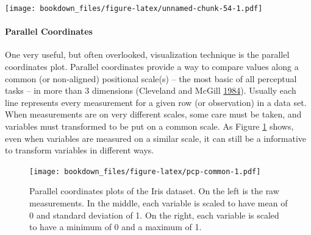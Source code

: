\documentclass[12pt,]{isuthesis}
\newenvironment{Shaded}{\begin{snugshade}}{\end{snugshade}}
\newcommand{\KeywordTok}[1]{\textcolor[rgb]{0.13,0.29,0.53}{\textbf{{#1}}}}
\newcommand{\DataTypeTok}[1]{\textcolor[rgb]{0.13,0.29,0.53}{{#1}}}
\newcommand{\FloatTok}[1]{\textcolor[rgb]{0.00,0.00,0.81}{{#1}}}
\newcommand{\StringTok}[1]{\textcolor[rgb]{0.31,0.60,0.02}{{#1}}}
\newcommand{\NormalTok}[1]{{#1}}
\let\oldparagraph\paragraph
\renewcommand{\paragraph}[1]{\oldparagraph{#1}\mbox{}}
\begin{document}
\texttt{[image: bookdown\_files/figure-latex/unnamed-chunk-54-1.pdf]}

\paragraph{Parallel Coordinates}\label{parallel-coordinates}

One very useful, but often overlooked, visualization technique is the
parallel coordinates plot. Parallel coordinates provide a way to compare
values along a common (or non-aligned) positional scale(s) -- the most
basic of all perceptual tasks -- in more than 3 dimensions (Cleveland
and McGill \protect\hyperlink{ref-graphical-perception}{1984}). Usually
each line represents every measurement for a given row (or observation)
in a data set. When measurements are on very different scales, some care
must be taken, and variables must transformed to be put on a common
scale. As Figure \ref{fig:pcp-common} shows, even when variables are
measured on a similar scale, it can still be a informative to transform
variables in different ways.

\begin{Shaded}
\end{Shaded}

\begin{figure}[htbp]
\centering
\texttt{[image: bookdown\_files/figure-latex/pcp-common-1.pdf]}
\caption{\label{fig:pcp-common}Parallel coordinates plots of the Iris
dataset. On the left is the raw measurements. In the middle, each
variable is scaled to have mean of 0 and standard deviation of 1. On the
right, each variable is scaled to have a minimum of 0 and a maximum of
1.}
\end{figure}
\end{document}
